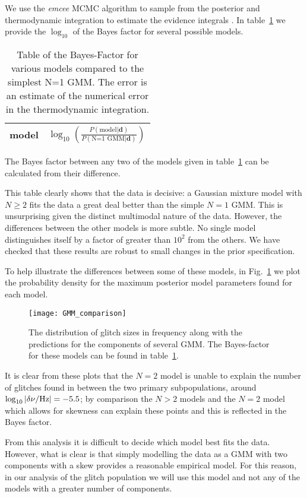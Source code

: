\documentclass[../full_thesis/full_thesis.tex]{subfiles}
\newcommand{\thisdir}{../glitches_in_CGW}
\begin{document}
\begin{subappendices}
We use the \emph{emcee} \citep{Foreman-Mackay2013} MCMC algorithm to sample from the
posterior and thermodynamic integration to estimate the evidence integrals
\citep{Goggans2004}. In table~\ref{tab: BF} we provide the $\log_{10}$ of the
Bayes factor for several possible models.
\begin{table}[htb]
\centering
\begin{tabular}{l|c}
model & $\log_{10}\left(
\frac{P(\textrm{model}| \mathbf{d})}{P(\textrm{N=1 GMM}| \mathbf{d})}
\right)$ \\ \hline

\end{tabular}
\caption{Table of the Bayes-Factor for various models compared to the
simplest N=1 GMM. The error is an estimate of the numerical error in the
thermodynamic integration. }
\label{tab: BF}
\end{table}
The Bayes factor between any two of the models given in table~\ref{tab: BF} can
be calculated from their difference.

This table clearly shows that the data is decisive: a Gaussian mixture model
with $N \ge 2$ fits the data a great deal better than the simple $N=1$ GMM.
This is unsurprising given the distinct multimodal nature of the data.
However, the differences between the other models is more subtle. No single model
distinguishes itself by a factor of greater than $10^{2}$ from the others. We
have checked that these results are robust to small changes in the prior
specification.

To help illustrate the differences between some of these models, in Fig.~\ref{fig: pdf}
we plot the probability density for the maximum posterior model parameters
found for each model.
\begin{figure}[htb]
\centering
\texttt{[image: GMM\_comparison]}
\caption{The distribution of glitch sizes in frequency along with the predictions
         for the components of several GMM. The Bayes-factor for these models
         can be found in table~\ref{tab: BF}.}
\label{fig: pdf}
\end{figure}
It is clear from these plots that the $N=2$ model is unable to explain
the number of glitches found in between the two primary subpopulations,
around $\log_{10}|\delta\nu/\textrm{Hz}|=-5.5$; by comparison the
$N>2$ models and the $N=2$ model which allows for skewness can explain these
points and this is reflected in the Bayes factor.

From this analysis it is difficult to decide which model best fits the data. However,
what is clear is that simply modelling the data as a GMM with two components with
a skew provides a reasonable empirical model. For this reason, in our analysis of the
glitch population we will use this model and not any of the
models with a greater number of components.


\end{subappendices}
\end{document}
